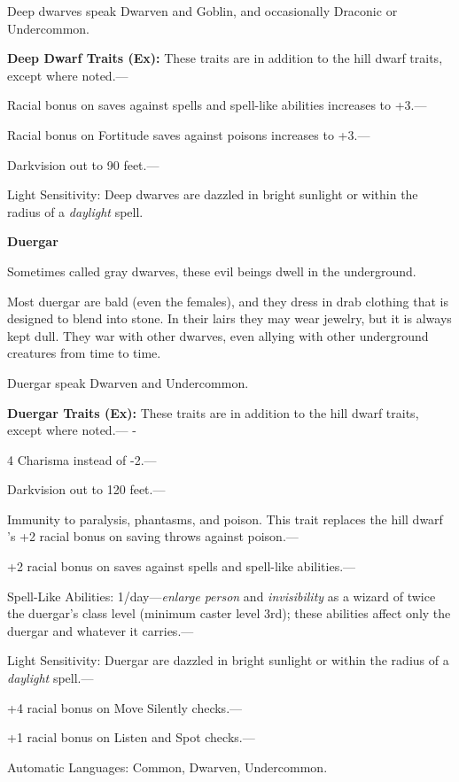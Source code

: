\documentclass{article}
\begin{document}
{Deep dwarves speak Dwarven and Goblin, and occasionally Draconic or Undercommon.

\textbf{Deep Dwarf Traits (Ex):} These traits are in addition to the hill dwarf 
traits, except where noted.---

Racial bonus on saves against spells and spell-like abilities increases to +3.---

Racial bonus on Fortitude saves against poisons increases to +3.---

Darkvision out to 90 feet.---

Light Sensitivity: Deep dwarves are dazzled in bright sunlight or within the radius 
of a \textit{daylight }spell.

\textbf{Duergar}

Sometimes called gray dwarves, these evil beings dwell in the underground.

Most duergar are bald (even the females), and they dress in drab clothing that 
is designed to blend into stone. In their lairs they may wear jewelry, but it is 
always kept dull. They war with other dwarves, even allying with other underground 
creatures from time to time.

Duergar speak Dwarven and Undercommon.

\textbf{Duergar Traits (Ex):} These traits are in addition to the hill dwarf traits, 
except where noted.--- -

\parindent=3pt
4 Charisma instead of -2.---

\parindent=0pt
Darkvision out to 120 feet.---

Immunity to paralysis, phantasms, and poison. This trait replaces the hill dwarf 
's +2 racial bonus on saving throws against poison.--- 

\parindent=3pt
+2 racial bonus on saves against spells and spell-like abilities.---

\parindent=0pt
Spell-Like Abilities: 1/day---\textit{enlarge person }and \textit{invisibility 
}as a wizard of twice the duergar's class level (minimum caster level 3rd); these 
abilities affect only the duergar and whatever it carries.---

Light Sensitivity: Duergar are dazzled in bright sunlight or within the radius 
of a \textit{daylight }spell.--- 

\parindent=3pt
+4 racial bonus on Move Silently checks.--- 

+1 racial bonus on Listen and Spot checks.---

Automatic Languages: Common, Dwarven, Undercommon.

}
\end{document}
